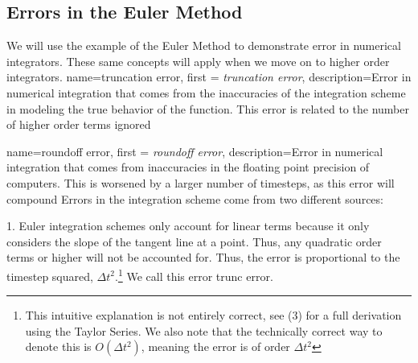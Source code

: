 \documentclass[12pt]{report}
\begin{document}

\subsection{Errors in the Euler Method}\label{sec:errors in the euler method}
We will use the example of the Euler Method to demonstrate error in numerical integrators. These same concepts will apply when we move on to higher order integrators. 
{
    name=truncation error,
    first = {\textit{truncation error}},
    description={Error in numerical integration that comes from the inaccuracies of the integration scheme in modeling the true behavior of the function. This error is related to the number of higher order terms ignored}
}

{
    name=roundoff error,
    first = {\textit{roundoff error}},
    description={Error in numerical integration that comes from inaccuracies in the floating point precision of computers. This is worsened by a larger number of timesteps, as this error will compound}
}
Errors in the integration scheme come from two different sources:

1. Euler integration schemes only account for linear terms because it only considers the slope of the tangent line at a point. Thus, any quadratic order terms or higher will not be accounted for. Thus, the error is proportional to the timestep squared, $\Delta t^2$.\footnote{This intuitive explanation is not entirely correct, see (3) for a full derivation using the Taylor Series. We also note that the technically correct way to denote this is $O(\Delta t^2)$, meaning the error is of order $\Delta t^2$} We call this error \gls{trunc error}.
\end{document}
